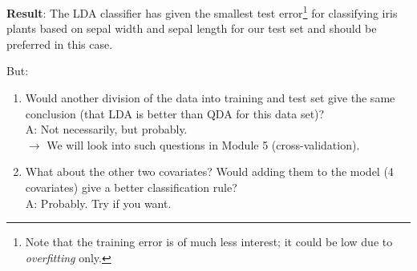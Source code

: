\documentclass[
  10pt,
  ignorenonframetext,
]{beamer}
\providecommand{\tightlist}{%
  \setlength{\itemsep}{0pt}\setlength{\parskip}{0pt}}
\begin{document}
\begin{frame}
\textbf{Result}: The LDA classifier has given the smallest test
error\footnote{Note that the training error is of much less interest; it could be low due to \emph{overfitting} only.}
for classifying iris plants based on sepal width and sepal length for
our test set and should be preferred in this case.

\vspace{2mm}

But:

\begin{enumerate}
\tightlist
\item
  Would another division of the data into training and test set give the
  same conclusion (that LDA is better than QDA for this data set)?\\
  A: Not necessarily, but probably.\\
  \(\rightarrow\) We will look into such questions in Module 5
  (cross-validation).
\end{enumerate}

\vspace{2mm}

\begin{enumerate}
\setcounter{enumi}{1}
\tightlist
\item
  What about the other two covariates? Would adding them to the model (4
  covariates) give a better classification rule?\\
  A: Probably. Try if you want.
\end{enumerate}
\end{frame}
\end{document}
